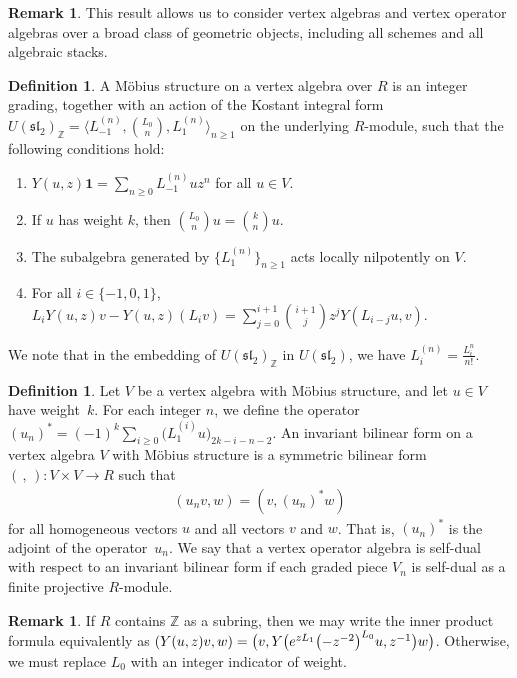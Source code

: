 \documentclass[11pt]{article}
\newcommand{\bZ}{\mathbb{Z}}
\newcommand{\unit}{\mathbf{1}}
\newcommand{\fsl}{\mathfrak{sl}}
\theoremstyle{definition}
\newtheorem{defn}[thm]{Definition}
\newtheorem{rem}[thm]{Remark}
\begin{document}
\begin{rem}This result allows us to consider vertex algebras and vertex operator algebras over a broad class of geometric objects, including all schemes and all algebraic stacks.
\end{rem}

\begin{defn}A M\"obius structure on a vertex algebra over $R$ is an integer grading, together with an action of the Kostant integral form $U(\fsl_2)_{\bZ} = \big\langle L_{-1}^{(n)}, \binom{L_0}{n}, L_1^{(n)} \big\rangle_{n \geq 1}$ on the underlying $R$-module, such that the following conditions hold:
\begin{enumerate}\itemsep=0pt
\item $Y(u,z)\unit = \sum\limits_{n \geq 0} L_{-1}^{(n)}u z^n$ for all $u \in V$.
\item If $u$ has weight $k$, then $\binom{L_0}{n}u = \binom{k}{n}u$.
\item The subalgebra generated by $\{ L_1^{(n)} \}_{n \geq 1}$ acts locally nilpotently on $V$.
\item For all $i \in \{-1,0,1\}$, $L_i Y(u,z)v - Y(u,z)(L_i v) = \sum\limits_{j =0}^{i+1} \binom{i+1}{j} z^j Y(L_{i-j} u,v)$.
\end{enumerate}
We note that in the embedding of $U(\fsl_2)_{\bZ}$ in $U(\fsl_2)$, we have $L_i^{(n)} = \frac{L_i^n}{n!}$.
\end{defn}

\begin{defn}Let $V$ be a vertex algebra with M\"obius structure, and let $u \in V$ have weight~$k$. For each integer $n$, we define the operator $(u_n)^* = (-1)^k \sum\limits_{i \geq 0} \big(L_1^{(i)} u\big)_{2k-i-n-2}$. An invariant bilinear form on a vertex algebra $V$ with M\"obius structure is a symmetric bilinear form $(\,,\,)\colon V \times V \to R$ such that
\begin{gather*} (u_n v,w) = (v, (u_n)^* w) \end{gather*}
for all homogeneous vectors $u$ and all vectors $v$ and $w$. That is, $(u_n)^*$ is the adjoint of the operator~$u_n$. We say that a vertex operator algebra is self-dual with respect to an invariant bilinear form if each graded piece $V_n$ is self-dual as a finite projective $R$-module.
\end{defn}

\begin{rem}If $R$ contains $\bZ$ as a subring, then we may write the inner product formula equivalently as $(Y(u,z)v,w) = \big(v, Y\big({\rm e}^{zL_1}\big({-}z^{-2}\big)^{L_0}u, z^{-1}\big)w\big)$. Otherwise, we must replace $L_0$ with an integer indicator of weight.
\end{rem}
\end{document}
